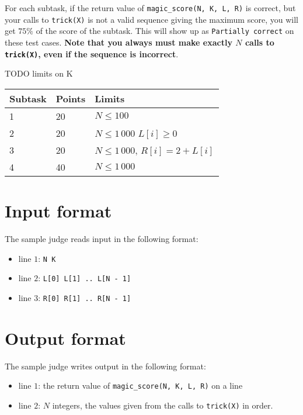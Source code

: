 For each subtask, if the return value of \texttt{magic\_score(N, K, L, R)} is correct, but your calls to \texttt{trick(X)}
is not a valid sequence giving the maximum score, you will get $75\%$ of the score of the subtask. This will show up as
\texttt{Partially correct} on these test cases. \textbf{Note that you always must make exactly $N$ calls to \texttt{trick(X)},
even if the sequence is incorrect}.

TODO limits on K

\begin{tabular}{|l|l|l|}
  \hline
  \textbf{Subtask} & \textbf{Points} & \textbf{Limits} \\ \hline
  1 & 20 & $N \le 100$ \\ \hline
  2 & 20 & $N \le 1\,000$ $L[i] \ge 0$\\ \hline
  3 & 20 & $N \le 1\,000$, $R[i] = 2 + L[i]$ \\ \hline
  4 & 40 & $N \le 1\,000$ \\ \hline
\end{tabular}

\section*{Input format}
The sample judge reads input in the following format:

\begin{itemize}
  \item line $1$: \texttt{N K}
  \item line $2$: \texttt{L[0] L[1] .. L[N - 1]}
  \item line $3$: \texttt{R[0] R[1] .. R[N - 1]}
\end{itemize}

\section*{Output format}
The sample judge writes output in the following format:

\begin{itemize}
  \item line $1$: the return value of \texttt{magic\_score(N, K, L, R)} on a line
  \item line $2$: $N$ integers, the values given from the calls to \texttt{trick(X)} in order.
\end{itemize}
